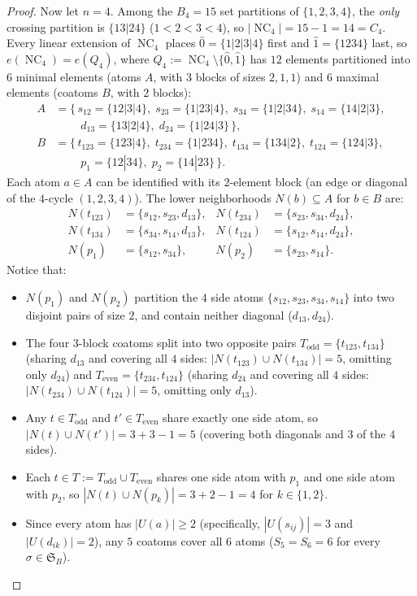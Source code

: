 \documentclass[11pt]{article}
\theoremstyle{definition}
\newcommand{\NC}{\operatorname{NC}}
\newcommand{\Sym}{\mathfrak{S}}
\begin{document}
\begin{proof}
Now let $n = 4$. Among the $B_4 = 15$ set partitions of $\{1, 2, 3, 4\}$, the \emph{only}
crossing partition is $\{13|24\}$ ($1 < 2 < 3 < 4$), so $|\NC_4| = 15 - 1 = 14 = C_4$.
Every linear extension of $\NC_4$ places $\hat{0} = \{1|2|3|4\}$ first and
$\hat{1} = \{1234\}$ last, so $e(\NC_4) = e(Q_4)$, where $Q_4 := \NC_4 \setminus
\{\hat{0}, \hat{1}\}$ has $12$ elements partitioned into $6$ minimal elements (atoms $A$,
with $3$ blocks of sizes $2,1,1$) and $6$ maximal elements (coatoms $B$, with $2$ blocks):
\begin{align*}
  A &= \bigl\{\, s_{12}=\{12|3|4\},\; s_{23}=\{1|23|4\},\;
                 s_{34}=\{1|2|34\},\; s_{14}=\{14|2|3\}, \\
    &\phantom{=\bigl\{\,\;} d_{13}=\{13|2|4\},\; d_{24}=\{1|24|3\} \,\bigr\}, \\
  B &= \bigl\{\, t_{123}=\{123|4\},\; t_{234}=\{1|234\},\;
                 t_{134}=\{134|2\},\; t_{124}=\{124|3\}, \\
    &\phantom{=\bigl\{\,\;} p_1=\{12|34\},\; p_2=\{14|23\} \,\bigr\}.
\end{align*}
Each atom $a \in A$ can be identified with its $2$-element block (an edge or diagonal of
the $4$-cycle $(1,2,3,4)$). The lower neighborhoods $N(b) \subseteq A$ for $b \in B$ are:
\begin{align*}
  N(t_{123}) &= \{s_{12}, s_{23}, d_{13}\}, &
  N(t_{234}) &= \{s_{23}, s_{34}, d_{24}\}, \\
  N(t_{134}) &= \{s_{34}, s_{14}, d_{13}\}, &
  N(t_{124}) &= \{s_{12}, s_{14}, d_{24}\}, \\
  N(p_1)     &= \{s_{12}, s_{34}\}, &
  N(p_2)     &= \{s_{23}, s_{14}\}.
\end{align*}
Notice that:
\begin{itemize}
  \item $N(p_1)$ and $N(p_2)$ partition the $4$ side atoms $\{s_{12}, s_{23}, s_{34},
  s_{14}\}$ into two disjoint pairs of size $2$, and contain neither diagonal ($d_{13},
  d_{24}$).
  \item The four $3$-block coatoms split into two opposite pairs
  $T_{\mathrm{odd}} = \{t_{123}, t_{134}\}$ (sharing $d_{13}$ and covering all $4$ sides:
  $|N(t_{123}) \cup N(t_{134})| = 5$, omitting only $d_{24}$) and
  $T_{\mathrm{even}} = \{t_{234}, t_{124}\}$ (sharing $d_{24}$ and covering all $4$ sides:
  $|N(t_{234}) \cup N(t_{124})| = 5$, omitting only $d_{13}$).
  \item Any $t \in T_{\mathrm{odd}}$ and $t' \in T_{\mathrm{even}}$ share exactly one side
  atom, so $|N(t) \cup N(t')| = 3 + 3 - 1 = 5$ (covering both diagonals and $3$ of the
  $4$ sides).
  \item Each $t \in T := T_{\mathrm{odd}} \cup T_{\mathrm{even}}$ shares one side atom
  with $p_1$ and one side atom with $p_2$, so $|N(t) \cup N(p_k)| = 3 + 2 - 1 = 4$ for
  $k \in \{1, 2\}$.
  \item Since every atom has $|U(a)| \ge 2$ (specifically, $|U(s_{ij})| = 3$ and
  $|U(d_{ik})| = 2$), any $5$ coatoms cover all $6$ atoms ($S_5 = S_6 = 6$ for every
  $\sigma \in \Sym_B$).
\end{itemize}


\end{proof}
\end{document}
